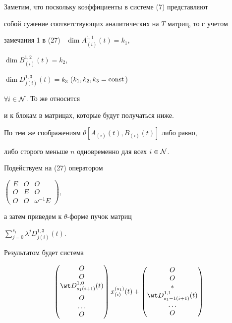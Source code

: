 \begin{pf}
Заметим, что поскольку коэффициенты в системе (7) представляют


собой сужение соответствующих аналитических на $T$ матриц, то с учетом


замечания 1 в (27) \ $\dim A_{(i)}^{1,1}(t)=k_1$,


$\dim B_{(i)}^{1,2}(t)=k_2$,


$\dim D_{j(i)}^{1,3}(t)=k_3$ ($k_1,k_2,k_3=\operatorname{const}$)


\; $\forall i \in \cal N$. То же относится


и к блокам в матрицах, которые будут получаться ниже.


По тем же соображениям $\theta [A_{(i)}(t),B_{(i)}(t)]$ либо равно,


либо сторого меньше $n$ одновременно для всех $i \in \cal N$.





Подействуем на (27) оператором


$\left(\begin{smallmatrix}


E & O & O \\ O & E & O \\ O & O & \omega^{-1} E


\end{smallmatrix}\right)$,


а затем приведем к $\theta$-форме пучок матриц


$\sum\limits_{j=0}^{s_1} \lambda^j D_{j(i)}^{1,3}(t)$.


Результатом будет система


\begin{gather}




\begin{pmatrix}


O \\ O \\ \wt D_{s_1(i+1)}^{1,0}(t) \\[2mm] O \\ \dotsc \\ O 


\end{pmatrix} x_{(i)}^{(s_1)}(t) +


\begin{pmatrix}


O \\ O \\ \ast \\ \wt D_{s_1-1(i+1)}^{1,1}(t) \\ \dotsc \\ O 



\end{pmatrix}
\end{gather}
\end{pf}
